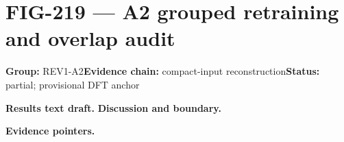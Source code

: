 \clearpage
\section{FIG-219 --- A2 grouped retraining and overlap audit}
\label{figpage:fig-219}
\textbf{Group:} REV1-A2\quad \textbf{Evidence chain:} compact-input reconstruction\quad \textbf{Status:} partial; provisional DFT anchor

\textbf{Results text draft.} 
\textbf{Discussion and boundary.} 


\textbf{Evidence pointers.}



\vfill

